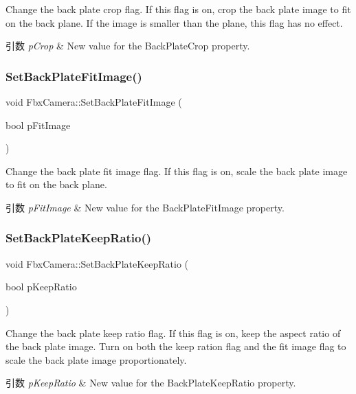 Change the back plate crop flag. If this flag is on, crop the back plate image to fit on the back plane. If the image is smaller than the plane, this flag has no effect. 
\begin{DoxyParams}{引数}
{\em p\+Crop} & New value for the Back\+Plate\+Crop property. \\
\hline
\end{DoxyParams}
\mbox{\label{class_fbx_camera_a05d48b887476bb61460f50d34721642d}} 
\subsubsection{\texorpdfstring{Set\+Back\+Plate\+Fit\+Image()}{SetBackPlateFitImage()}}
{\footnotesize\ttfamily void Fbx\+Camera\+::\+Set\+Back\+Plate\+Fit\+Image (\begin{DoxyParamCaption}\item[{bool}]{p\+Fit\+Image }\end{DoxyParamCaption})}

Change the back plate fit image flag. If this flag is on, scale the back plate image to fit on the back plane. 
\begin{DoxyParams}{引数}
{\em p\+Fit\+Image} & New value for the Back\+Plate\+Fit\+Image property. \\
\hline
\end{DoxyParams}
\mbox{\label{class_fbx_camera_ad60007e61d4a9ca5e3f4434beebdca95}} 
\subsubsection{\texorpdfstring{Set\+Back\+Plate\+Keep\+Ratio()}{SetBackPlateKeepRatio()}}
{\footnotesize\ttfamily void Fbx\+Camera\+::\+Set\+Back\+Plate\+Keep\+Ratio (\begin{DoxyParamCaption}\item[{bool}]{p\+Keep\+Ratio }\end{DoxyParamCaption})}

Change the back plate keep ratio flag. If this flag is on, keep the aspect ratio of the back plate image. Turn on both the keep ration flag and the fit image flag to scale the back plate image proportionately. 
\begin{DoxyParams}{引数}
{\em p\+Keep\+Ratio} & New value for the Back\+Plate\+Keep\+Ratio property. \\
\hline
\end{DoxyParams}
\mbox{\label{class_fbx_camera_a23f2f8bba739049a5e0ea55213085787}} 
